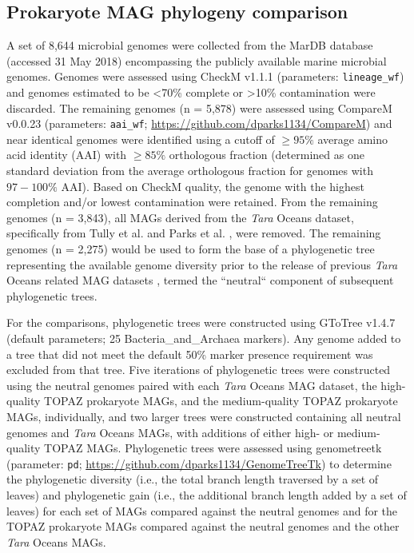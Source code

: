 \documentclass[12pt]{article}
\numberwithin{equation}{section}
\begin{document}
\subsection*{Prokaryote MAG phylogeny comparison} 
A set of 8,644 microbial genomes were collected from the MarDB database \citep{Klemetsen:2017fg}(accessed 31 May 2018) encompassing the publicly available marine microbial genomes. Genomes were assessed using CheckM 
v1.1.1 \citep{Parks2015CheckM}(parameters: \texttt{lineage\_wf}) and genomes estimated to be <70\% complete or >10\% contamination were discarded. The remaining genomes (n = 5,878) were assessed using CompareM v0.0.23
(parameters: \texttt{aai\_wf}; \url{https://github.com/dparks1134/CompareM}) and near identical genomes were identified using a cutoff of $\geq 95\%$ average amino acid identity (AAI) with $\geq 85\%$ orthologous fraction (determined as one standard deviation from the average orthologous fraction for genomes with $97-100\%$ AAI).
Based on CheckM quality, the genome with the highest completion and/or lowest contamination were retained. From the remaining genomes (n = 3,843), all MAGs derived from the \textit{Tara} Oceans dataset, specifically from Tully et al. \citet{Tully2018reconstruction} and Parks et al. \citet{Parks2017Recovery}, were removed. The remaining genomes (n = 2,275) would be used to form the base of a phylogenetic tree representing the available genome diversity prior to the release of previous \textit{Tara} Oceans related MAG datasets \citet{Tully2018reconstruction, Parks2017Recovery, Delmont2018Nitrogen-fixing}, termed the ``neutral`` component of subsequent phylogenetic trees.

For the comparisons, phylogenetic trees were constructed using GToTree v1.4.7 \citep{Lee_2019} (default parameters; 25 Bacteria\_and\_Archaea markers). Any genome added to a tree that did not meet the default 50\% marker presence requirement was excluded from that tree. Five iterations of phylogenetic trees were constructed using the neutral genomes paired with each \textit{Tara} Oceans MAG dataset, the high-quality TOPAZ prokaryote MAGs, and the medium-quality TOPAZ prokaryote MAGs, individually, and two larger trees were constructed containing all neutral genomes and \textit{Tara} Oceans MAGs, with additions of either high- or medium-quality TOPAZ MAGs. Phylogenetic trees were assessed using genometreetk (parameter: \texttt{pd}; \url{https://github.com/dparks1134/GenomeTreeTk}) to determine the phylogenetic diversity (i.e., the total branch length traversed by a set of leaves) and phylogenetic gain (i.e., the additional branch length added by a set of leaves) \citep{Parks2017Recovery} for each set of MAGs compared against the neutral genomes and for the TOPAZ prokaryote MAGs compared against the neutral genomes and the other \textit{Tara} Oceans MAGs.
\end{document}
